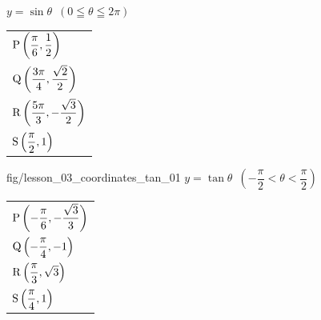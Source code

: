 
\SetRowSpace{2mm}

  {$y=\sin\theta$\ $(0\leqq\theta\leqq2\pi)$}
  {\begin{tabular}[t]{@{}l@{}}
    ${\rm P}\left(\dfrac{\pi}{6},\dfrac{1}{2}\right)$\\[4mm]
    ${\rm Q}\left(\dfrac{3\pi}{4},\dfrac{\sqrt{2}}{2}\right)$\\[4mm]
    ${\rm R}\left(\dfrac{5\pi}{3},-\dfrac{\sqrt{3}}{2}\right)$\\[4mm]
    ${\rm S}\left(\dfrac{\pi}{2},1\right)$
  \end{tabular}}
  {fig/lesson_03_coordinates_tan_01}
  {$y=\tan\theta$\ $\left(-\dfrac{\pi}{2}<\theta<\dfrac{\pi}{2}\right)$}
  {\begin{tabular}[t]{@{}l@{}}
    ${\rm P}\left(-\dfrac{\pi}{6},-\dfrac{\sqrt{3}}{3}\right)$\\[4mm]
    ${\rm Q}\left(-\dfrac{\pi}{4},-1\right)$\\[4mm]
    ${\rm R}\left(\dfrac{\pi}{3},\sqrt{3}\right)$\\[4mm]
    ${\rm S}\left(\dfrac{\pi}{4},1\right)$
  \end{tabular}}

